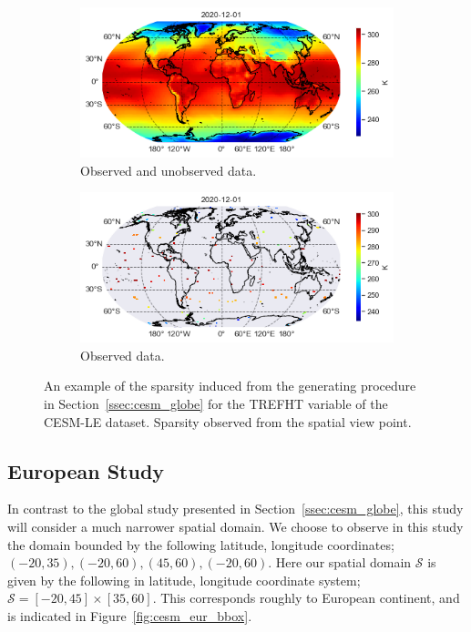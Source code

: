 \begin{figure}
	\centering
	\begin{subfigure}[b]{0.45\textwidth}
		\includegraphics[width=\textwidth]{globe_sparse_full}
		\caption{Observed and unobserved data.}
	\end{subfigure}
	\hfill        
	\begin{subfigure}[b]{0.45\textwidth}
		\includegraphics[width=\textwidth]{globe_sparse_train}
		\caption{Observed data.}
	\end{subfigure}
	\caption{An example of the sparsity induced from the  generating procedure in Section~\ref{ssec:cesm_globe} for the TREFHT variable of the CESM-LE dataset. Sparsity observed from the spatial view point.}
	\label{fig:cesm_sparsity}
\end{figure}

\subsection{European Study \label{ssec:cesm_eur}}
In contrast to the global study presented in Section~\ref{ssec:cesm_globe}, this study will consider a much narrower spatial domain.
We choose to observe in this study the domain bounded by the following latitude, longitude coordinates; $\left(-20, 35\right), \left(-20, 60\right), \left(45, 60\right), \left(-20, 60\right)$.
Here our spatial domain $\mathcal{S}$ is given by the following in latitude, longitude coordinate system; $\mathcal{S} = \left[-20, 45\right] \times \left[35, 60\right]$.
This corresponds roughly to European continent, and is indicated in Figure~\ref{fig:cesm_eur_bbox}.

